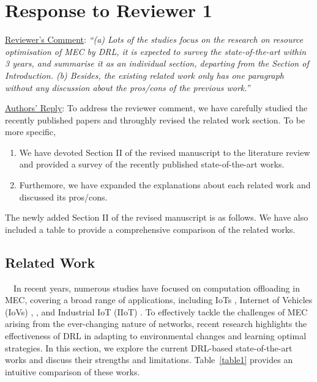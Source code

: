 \documentclass[12pt,draftclsnofoot,onecolumn]{IEEEtran}
\newcommand{\rev}[1]{{\color{blue}#1}} %
\newcommand{\rev}[1]{#1}
\newenvironment{my}[2]%
{\begin{list}{}%
{\setlength{\rightmargin}{#1}\setlength{\leftmargin}{#2}}%


 \item[]{}

} {\end{list}}
\begin{document}
\setcounter{section}{0}
\renewcommand*{\thesection}{\Roman{section}}
\makeatletter
\setcounter{table}{0}

\section{Response to Reviewer 1}
\begin{enumerate}
\label{section:300}
\item \underline{Reviewer's Comment}: 
\textit{``(a) Lots of the studies focus on the research on resource optimisation of MEC by DRL, it is expected to survey the state-of-the-art within 3 years, and summarise it as an individual section, departing from the Section of Introduction. (b) Besides, the existing related work only has one paragraph without any discussion about the pros/cons of the previous work.''} \newline

\underline{Authors' Reply}: To address the reviewer comment, we have carefully studied the recently published papers and throughly revised the related work section. To be more specific,
\begin{enumerate}[]
\item We have devoted Section II of the revised manuscript to the literature review and provided a survey of the recently published state-of-the-art works.
\item Furthemore, we have expanded the explanations about each related work and discussed its pros/cons.
\end{enumerate}\vspace{6mm}
The newly added Section II of the revised manuscript is as follows. We have also included a table to provide a comprehensive comparison of the related works. 
\begin{my}{1cm}{1cm}
	\rev{\setcounter{section}{1}
		\section{Related Work}
		\label{section:II}
		
		\,\,\,\,
		In recent years, numerous studies have focused on computation offloading in MEC, covering a broad range of applications, including IoTs \cite{zhang2023multi}, Internet of Vehicles (IoVs) \cite{lin2022multi}, \cite{wei2023many}, and Industrial IoT (IIoT) \cite{yuan2023adaptive}. 
		To effectively tackle the challenges of MEC arising from the ever-changing nature of networks, recent research highlights the effectiveness of DRL in adapting to environmental changes and learning optimal strategies. In this section, we explore the current DRL-based state-of-the-art works and discuss their strengths and limitations. Table~\ref{table1} provides an intuitive comparison of these works.
}
\end{my}
\end{enumerate}
\end{document}
